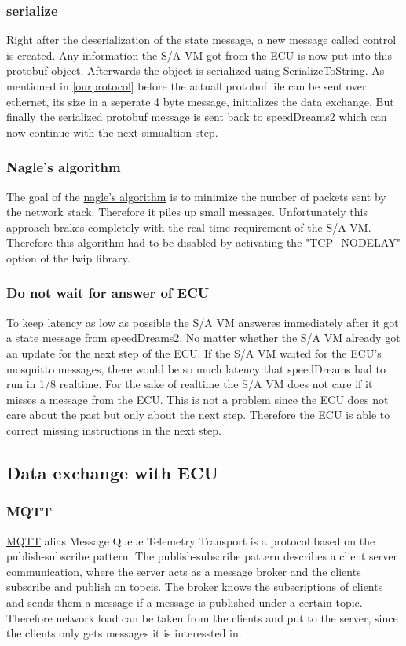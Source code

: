 \documentclass[paper=a4, fontsize=11pt]{scrartcl}
\begin{document}
  \subsubsection{serialize}
Right after the deserialization of the state message, a new message called control is created. Any information the S/A VM got from the ECU is now put into this protobuf object. Afterwards the object is serialized using SerializeToString. As mentioned in \ref{ourprotocol} before the actuall protobuf file can be sent over ethernet, its size in a seperate 4 byte message, initializes the data exchange. But finally the serialized protobuf message is sent back to speedDreams2 which can now continue with the next simualtion step.
  \subsubsection{Nagle's algorithm}
The goal of the \href{https://www.lifewire.com/nagle-algorithm-for-tcp-network-communication-817932}{nagle's algorithm} is to minimize the number of packets sent by the network stack. Therefore it piles up small messages. Unfortunately this approach brakes completely with the real time requirement of the S/A VM. Therefore this algorithm had to be disabled by activating the "TCP\_NODELAY" option of the lwip library.
  \subsubsection{Do not wait for answer of ECU}
To keep latency as low as possible the S/A VM answeres immediately after it got a state message from speedDreams2. No matter whether the S/A VM already got an update for the next step of the ECU. If the S/A VM waited for the ECU's mosquitto messages, there would be so much latency that speedDreams had to run in 1/8 realtime. For the sake of realtime the S/A VM does not care if it misses a message from the ECU. This is not a problem since the ECU does not care about the past but only about the next step. Therefore the ECU is able to correct missing instructions in the next step.
\newpage
\subsection{Data exchange with ECU}
  \subsubsection{MQTT}
\href{http://mqtt.org/}{MQTT} alias Message Queue Telemetry Transport is a protocol based on the publish-subscribe pattern.\newline
The publish-subscribe pattern describes a client server communication, where the server acts as a message broker and the clients subscribe and publish on topcis. The broker knows the subscriptions of clients and sends them a message if a message is published under a certain topic. Therefore network load can be taken from the clients and put to the server, since the clients only gets messages it is interessted in.
\end{document}
